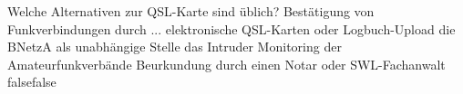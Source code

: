     {Welche Alternativen zur QSL-Karte sind üblich? Bestätigung von Funkverbindungen durch ...}
    {elektronische QSL-Karten oder Logbuch-Upload}
    {die BNetzA als unabhängige Stelle}
    {das Intruder Monitoring der Amateurfunkverbände}
    {Beurkundung durch einen Notar oder SWL-Fachanwalt}
    {false}{false}